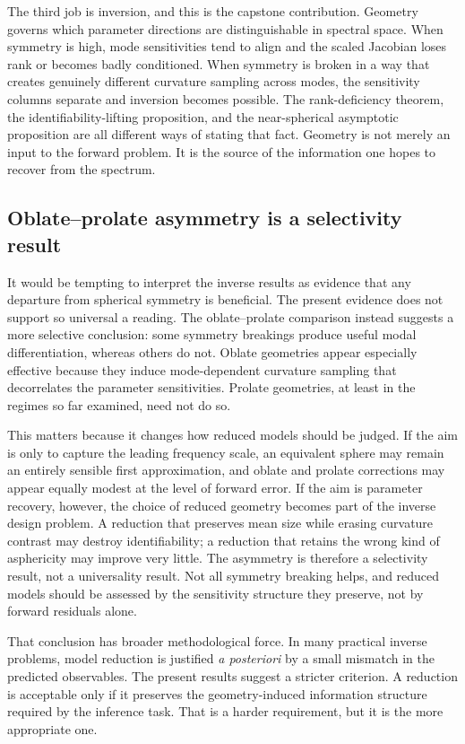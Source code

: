 The third job is inversion, and this is the capstone contribution.  Geometry
governs which parameter directions are distinguishable in spectral space.  When
symmetry is high, mode sensitivities tend to align and the scaled Jacobian loses
rank or becomes badly conditioned.  When symmetry is broken in a way that
creates genuinely different curvature sampling across modes, the sensitivity
columns separate and inversion becomes possible.  The rank-deficiency theorem,
the identifiability-lifting proposition, and the near-spherical asymptotic
proposition are all different ways of stating that fact.  Geometry is not
merely an input to the
forward problem.  It is the source of the information one hopes to recover from
the spectrum.

\subsection{Oblate--prolate asymmetry is a selectivity result}

It would be tempting to interpret the inverse results as evidence that any
departure from spherical symmetry is beneficial.  The present evidence does not
support so universal a reading.  The oblate--prolate comparison instead suggests
a more selective conclusion: some symmetry breakings produce useful modal
differentiation, whereas others do not.  Oblate geometries appear especially
effective because they induce mode-dependent curvature sampling that decorrelates
the parameter sensitivities.  Prolate geometries, at least in the regimes so far
examined, need not do so.

This matters because it changes how reduced models should be judged.  If the aim
is only to capture the leading frequency scale, an equivalent sphere may remain
an entirely sensible first approximation, and oblate and prolate corrections may
appear equally modest at the level of forward error.  If the aim is parameter
recovery, however, the choice of reduced geometry becomes part of the inverse
design problem.  A reduction that preserves mean size while erasing curvature
contrast may destroy identifiability; a reduction that retains the wrong kind of
asphericity may improve very little.  The asymmetry is therefore a selectivity
result, not a universality result.  Not all symmetry breaking helps, and reduced
models should be assessed by the sensitivity structure they preserve, not by
forward residuals alone.

That conclusion has broader methodological force.  In many practical inverse
problems, model reduction is justified \emph{a posteriori} by a small mismatch in
the predicted observables.  The present results suggest a stricter criterion.  A
reduction is acceptable only if it preserves the geometry-induced information
structure required by the inference task.  That is a harder requirement, but it
is the more appropriate one.

